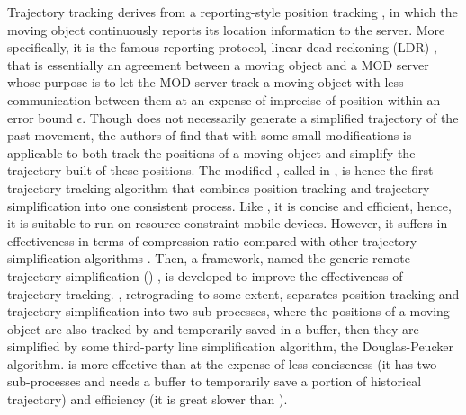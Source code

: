 Trajectory tracking derives from a reporting-style position tracking \cite{Leonhardi:Comparison}, in which the moving object continuously reports its location information to the server. More specifically, it is the famous reporting protocol, linear dead reckoning (LDR) \cite{Leonhardi:Comparison,Civilis:Techniques,Wolfson:PositionTracking},  that is essentially an agreement between a moving object and a MOD server whose purpose is to let the MOD server track a moving object with less communication between them at an expense of imprecise of position within an error bound $\epsilon$. 
%
Though \ldr does not necessarily generate a simplified trajectory of the past movement, the authors of \cite{Trajcevski:LDRH} find that \ldr with some small modifications is applicable to both track the positions of a moving object and simplify the trajectory built of these positions. The modified \ldr,  called \ldrh in \cite{Lange:Tracking}, is hence the first trajectory tracking algorithm that combines position tracking and trajectory simplification into one consistent process. Like \ldr, it is concise and efficient, hence, it is suitable to run on resource-constraint mobile devices. However, it suffers in effectiveness in terms of compression ratio compared with other trajectory simplification algorithms \cite{Douglas:Peucker, Lin:Cised}. %
%
Then, a framework, named the generic remote trajectory simplification (\grts) \cite{Lange:GRTS,Lange:Tracking}, is developed to improve the effectiveness of trajectory tracking. \grts, retrograding to some extent, separates position tracking and trajectory simplification into two sub-processes, where the positions of a moving object are also tracked by \ldr and temporarily saved in a buffer, then they are simplified by some third-party line simplification algorithm, \eg the Douglas-Peucker \cite{Douglas:Peucker} algorithm. \grts is more effective than \ldrh at the expense of less conciseness (it has two sub-processes and needs a buffer to temporarily save a portion of historical trajectory) and efficiency (it is great slower than \ldrh).
%



